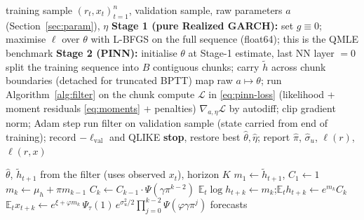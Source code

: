 \documentclass[11pt]{article}
\newcommand{\E}{\mathbb{E}}
\newcommand{\lh}{\tilde h}
\begin{document}
\begin{algorithm}[h]
\caption{QMLE / gradient training of the PINN}\label{alg:train}
\begin{algorithmic}[1]
\Require training sample $(r_t,x_t)_{t=1}^{n}$, validation sample, raw parameters $a$ (Section~\ref{sec:param}), $\eta$
\State \textbf{Stage 1 (pure Realized GARCH):} set $g\equiv0$; maximise $\ell$ over $\theta$ with L-BFGS on the full sequence (float64); this is the QMLE benchmark
\State \textbf{Stage 2 (PINN):} initialise $\theta$ at Stage-1 estimate, last NN layer $=0$
  \State split the training sequence into $B$ contiguous chunks; carry $\lh$ across chunk boundaries (detached for truncated BPTT)
    \State map raw $a\mapsto\theta$; run Algorithm~\ref{alg:filter} on the chunk
    \State compute $\mathcal L$ in \eqref{eq:pinn-loss} (likelihood + moment residuals \eqref{eq:moments} + penalties)
    \State $\nabla_{a,\eta}\mathcal L$ by autodiff; clip gradient norm; Adam step
  \EndFor
  \State run filter on validation sample (state carried from end of training); record $-\ell_{\text{val}}$ and QLIKE
   \textbf{stop}, restore best \EndIf
\EndFor
\State \Return $\hat\theta,\hat\eta$; report $\hat\pi$, $\hat\sigma_u$, $\ell(r)$, $\ell(r,x)$
\end{algorithmic}
\end{algorithm}

\begin{algorithm}[h]
\caption{$k$-step forecasting (pure Realized GARCH; with NN, use simulation, Algorithm~\ref{alg:sim})}\label{alg:fc}
\begin{algorithmic}[1]
\Require $\hat\theta$, $\lh_{t+1}$ from the filter (uses observed $x_t$), horizon $K$
\State $m_1\gets\lh_{t+1}$, $C_1\gets1$
  \State $m_k\gets\mu_h+\pi m_{k-1}$ \Comment{$\mu_h=\omega+\gamma\xi$, $\pi=\beta+\varphi\gamma$; $\E\tau(z)=\E u=0$}
  \State $C_k\gets C_{k-1}\cdot\Psi(\gamma\pi^{k-2})$ \Comment{\eqref{eq:mgf}}
\EndFor
{}
  \State $\E_t\log h_{t+k}\gets m_k$;\quad $\E_t h_{t+k}\gets e^{m_k}C_k$
  \State $\E_t x_{t+k}\gets e^{\xi+\varphi m_k}\,\Psi_\tau(1)\,e^{\sigma_u^2/2}\prod_{j=0}^{k-2}\Psi(\varphi\gamma\pi^j)$ \Comment{\eqref{eq:fc-x}}
\EndFor
\State \Return forecasts
\end{algorithmic}
\end{algorithm}
\end{document}
